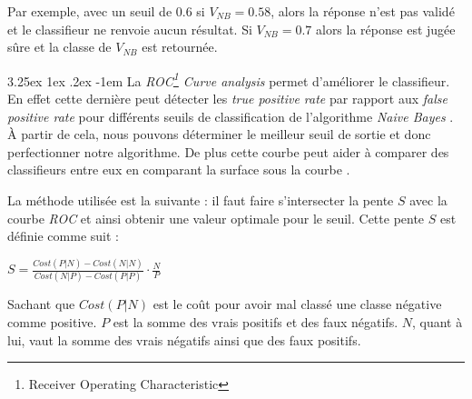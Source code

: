\documentclass[a4paper, 11pt]{article}
\makeatletter
\renewcommand\paragraph{\@startsection{paragraph}{5}{\z@}%
  {3.25ex \@plus1ex \@minus.2ex}%
  {-1em}%
  {\normalfont\normalsize\bfseries}}
\makeatother
\begin{document}
Par exemple, avec un seuil de $0.6$ si $V_{NB} = 0.58$, alors la réponse n'est pas validé et le classifieur ne renvoie aucun
résultat. Si $V_{NB} = 0.7$ alors la réponse est jugée sûre et la classe de $V_{NB}$ est retournée. 

\paragraph{}\label{section roc curve analysis}
La \textit{ROC\footnote{Receiver Operating Characteristic} Curve analysis} permet d'améliorer le classifieur. 
En effet cette dernière peut détecter les \textit{true positive rate} par rapport aux \textit{false positive rate} 
pour différents seuils de classification de l'algorithme \textit{Naive Bayes} \cite{machine_learning_automated_trading}. 
À partir de cela, nous pouvons déterminer le meilleur seuil de sortie et donc perfectionner notre algorithme.
De plus cette courbe peut aider à comparer des classifieurs entre eux en comparant 
la surface sous la courbe \cite{machine_learning_automated_trading}.

La méthode utilisée est la suivante \cite{machine_learning_automated_trading}: il faut faire s'intersecter 
la pente $S$ avec la courbe \textit{ROC} et ainsi obtenir une valeur optimale pour le seuil.
Cette pente $S$ est définie comme suit \cite{machine_learning_automated_trading}:
\begin{center}
$S = \frac{Cost(P|N) - Cost(N|N)}{Cost(N|P) - Cost(P|P)} \cdot \frac{N}{P}$
\end{center}
Sachant que $Cost(P|N)$ est le coût pour avoir mal classé une classe négative comme positive. 
$P$ est la somme des vrais positifs et des faux négatifs. $N$, quant à lui, 
vaut la somme des vrais négatifs ainsi que des faux positifs.
\end{document}
